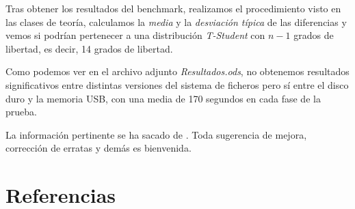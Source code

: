 \documentclass[paper=a4, fontsize=11pt]{scrartcl} %
\numberwithin{equation}{section} %
\numberwithin{figure}{section} %
\numberwithin{table}{section} %
\begin{document}
\begin{enumerate}
\begin{itemize}
			Tras obtener los resultados del benchmark, realizamos el procedimiento visto en las clases
			de teoría, calculamos la \textit{media} y la \textit{desviación típica} de las diferencias
			y vemos si podrían pertenecer a una distribución \textit{T-Student} con $n-1$ grados de
			libertad, es decir, 14 grados de libertad.
			
			Como podemos ver en el archivo adjunto \textit{Resultados.ods}, no obtenemos resultados
			significativos entre distintas versiones del sistema de ficheros pero sí entre el disco
			duro y la memoria USB, con una media de 170 segundos en cada fase de la prueba.
		\end{itemize}
		
		La información pertinente se ha sacado de \cite{benchmark}. Toda sugerencia de mejora,
		corrección de erratas y demás es bienvenida.
		
\end{enumerate}

\newpage
\section{Referencias}

\end{document}
